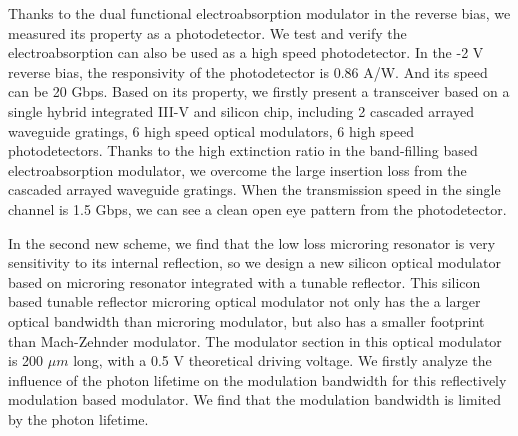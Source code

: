 \begin{englishabstract}
Thanks to the dual functional  electroabsorption modulator in the reverse bias, we measured its property as a photodetector. We test and verify the electroabsorption can also be used as a high speed photodetector. In the -2 V reverse bias, the responsivity of the photodetector is 0.86 A/W. And its speed can be 20 Gbps. Based on its property, we firstly present a transceiver based on a single hybrid integrated III-V and silicon chip, including 2 cascaded arrayed waveguide gratings, 6 high speed optical modulators, 6 high speed photodetectors. Thanks to the high extinction ratio in the band-filling based electroabsorption modulator, we overcome the large insertion loss from the cascaded arrayed waveguide gratings. When the transmission speed in the single channel is 1.5 Gbps, we can see a clean open eye pattern from the photodetector.

In the second new scheme, we find that the low loss microring resonator is very sensitivity to its internal reflection, so we design a new silicon optical modulator based on microring resonator integrated with a tunable reflector. This silicon based tunable reflector microring optical modulator not only has the a larger optical bandwidth than microring modulator, but also has a smaller footprint than Mach-Zehnder modulator. The modulator section in this optical modulator is 200 $\mu m$ long, with a 0.5 V theoretical driving voltage. We firstly analyze the influence of the photon lifetime on the modulation bandwidth for this reflectively modulation based modulator. We find that the modulation bandwidth is limited by the photon lifetime.


\end{englishabstract}
